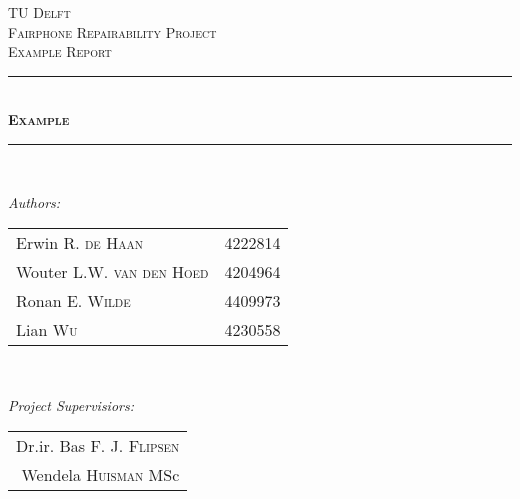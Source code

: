 \documentclass[12pt]{scrreprt}
\begin{document}
\begin{titlepage}

\newcommand{\HRule}{\rule{\linewidth}{0.5mm}} %

\center %
 

\textsc{\LARGE TU Delft}\\[1.5cm] %
\textsc{\Large Fairphone Repairability Project}\\[0.5cm] %
\textsc{\large Example Report}\\[0.5cm] %


\HRule \\[0.4cm]
\textsc{\huge \bfseries Example}\\[0.2cm] %
\HRule \\[1.5cm]
 

\begin{minipage}{0.45\textwidth}
\begin{flushleft} \large
\emph{Authors:}\\
\begin{tabular}{ll}
Erwin R. \textsc{de Haan} & 4222814\\
Wouter L.W. \textsc{van den Hoed} & 4204964 \\
Ronan E. \textsc{Wilde} & 4409973 \\
Lian \textsc{Wu} & 4230558 \\
\end{tabular}

\end{flushleft}
\end{minipage}
~
\begin{minipage}{0.45\textwidth}
\begin{flushright} \large
\emph{Project Supervisiors:} \\
\begin{tabular}{r}
Dr.ir. Bas F. J. \textsc{Flipsen}\\
Wendela \textsc{Huisman} MSc\\
\end{tabular}
\end{flushright}
\end{minipage}\\[1.5cm]


\end{titlepage}
\end{document}
